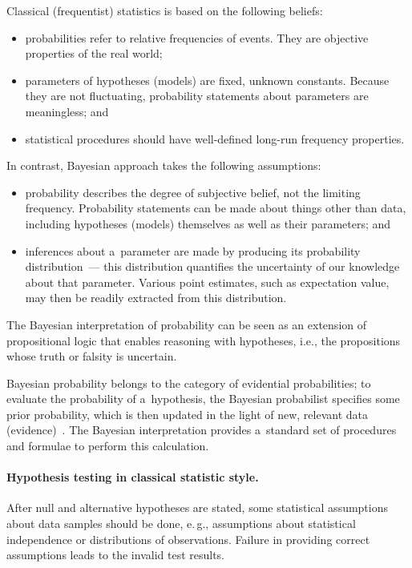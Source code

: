 \begin{multicols}{2}
  Classical (frequentist) statistics is based on the following beliefs:
  \begin{itemize}
\item probabilities refer to relative frequencies of events. They are objective
properties of the real world;
\item parameters of hypotheses (models) are fixed, unknown constants. Because
they are not fluctuating, probability statements about parameters are meaningless; and
\item statistical procedures should have well-defined long-run frequency
properties.
\end{itemize}

  In contrast, Bayesian approach takes the following assumptions:
  \begin{itemize}
\item probability describes the degree of subjective belief, not the limiting
frequency. Probability statements can be made about things other than data,
including hypotheses (models) themselves as well as their parameters;
and
\item inferences about a~parameter are made by producing its probability
distribution~--- this distribution quantifies the uncertainty of our knowledge about
that parameter. Various point estimates, such as expectation value, may then be
readily extracted from this distribution.
\end{itemize}

  The Bayesian interpretation of probability can be seen as an extension
of propositional logic that enables reasoning with hypotheses, i.e.,
the propositions whose truth or falsity is uncertain.

  Bayesian probability belongs to the category of evidential probabilities; to evaluate
the probability of a~hypothesis, the Bayesian probabilist specifies some prior
probability, which is then updated in the light of new,
relevant data (evidence)~\cite{28-kl}. The Bayesian interpretation provides a~standard set of procedures and formulae to perform this calculation.

\vspace*{-6pt}

  \paragraph*{Hypothesis testing in classical statistic style.} After null and alternative
hypotheses are stated, some statistical assumptions about data samples should be
done, e.\,g., assumptions about statistical independence or distributions of observations.
Failure in providing correct assumptions leads to the invalid test results.


\end{multicols}

